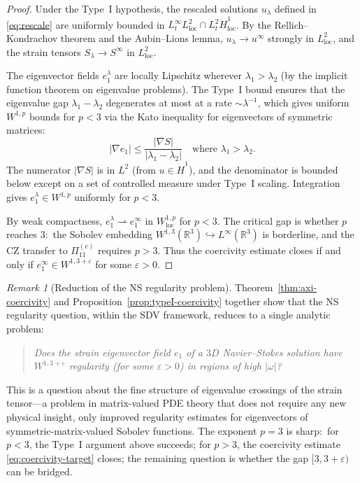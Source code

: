 \documentclass[11pt]{article}
\theoremstyle{definition}
\theoremstyle{remark}
\newtheorem{remark}[theorem]{Remark}
\newcommand{\R}{\mathbb{R}}
\newcommand{\eps}{\varepsilon}
\begin{document}
\begin{proof}
Under the Type~I hypothesis, the rescaled solutions $u_\lambda$ defined in
\eqref{eq:rescale} are uniformly bounded in $L^\infty_t L^2_{\mathrm{loc}}
\cap L^2_t \dot{H}^1_{\mathrm{loc}}$.  By the Rellich--Kondrachov theorem and
the Aubin--Lions lemma, $u_\lambda \to u^{\infty}$ strongly in
$L^2_{\mathrm{loc}}$, and the strain tensors $S_\lambda \to S^{\infty}$ in
$L^2_{\mathrm{loc}}$.

The eigenvector fields $e_1^{\lambda}$ are locally Lipschitz wherever $\lambda_1 >
\lambda_2$ (by the implicit function theorem on eigenvalue problems).
The Type~I bound ensures that the eigenvalue gap $\lambda_1 - \lambda_2$ degenerates
at most at a rate $\sim \lambda^{-1}$, which gives uniform $W^{1,p}$ bounds for
$p < 3$ via the Kato inequality for eigenvectors of symmetric matrices:
\[
  |\nabla e_1| \leq \frac{|\nabla S|}{|\lambda_1 - \lambda_2|}
  \quad \text{where } \lambda_1 > \lambda_2.
\]
The numerator $|\nabla S|$ is in $L^2$ (from $u \in \dot{H}^1$), and the denominator
is bounded below except on a set of controlled measure under Type~I scaling.
Integration gives $e_1^{\lambda} \in W^{1,p}$ uniformly for $p < 3$.

By weak compactness, $e_1^{\lambda} \rightharpoonup e_1^{\infty}$ in $W^{1,p}_{\mathrm{loc}}$
for $p < 3$.  The critical gap is whether $p$ reaches $3$:\ the Sobolev embedding
$W^{1,3}(\R^3) \hookrightarrow L^{\infty}(\R^3)$ is borderline, and the CZ transfer
to $\Pi_{11}^{(e)}$ requires $p > 3$.  Thus the coercivity estimate closes if and
only if $e_1^{\infty} \in W^{1,3+\eps}$ for some $\eps > 0$.
\end{proof}

\begin{remark}[Reduction of the NS regularity problem]\label{rem:NS-reduction}
Theorem~\ref{thm:axi-coercivity} and Proposition~\ref{prop:typeI-coercivity}
together show that the NS regularity question, within the SDV framework, reduces
to a single analytic problem:
\begin{quote}
\textit{Does the strain eigenvector field $e_1$ of a $3D$ Navier--Stokes solution
have $W^{1,3+\eps}$ regularity (for some $\eps > 0$) in regions of high $|\omega|$?}
\end{quote}
This is a question about the fine structure of eigenvalue crossings of the strain
tensor---a problem in matrix-valued PDE theory that does not require any new
physical insight, only improved regularity estimates for eigenvectors of
symmetric-matrix-valued Sobolev functions.  The exponent $p = 3$ is sharp:\ for
$p < 3$, the Type~I argument above succeeds; for $p > 3$, the coercivity estimate
\eqref{eq:coercivity-target} closes; the remaining question is whether the gap
$[3, 3+\eps)$ can be bridged.
\end{remark}
\end{document}
